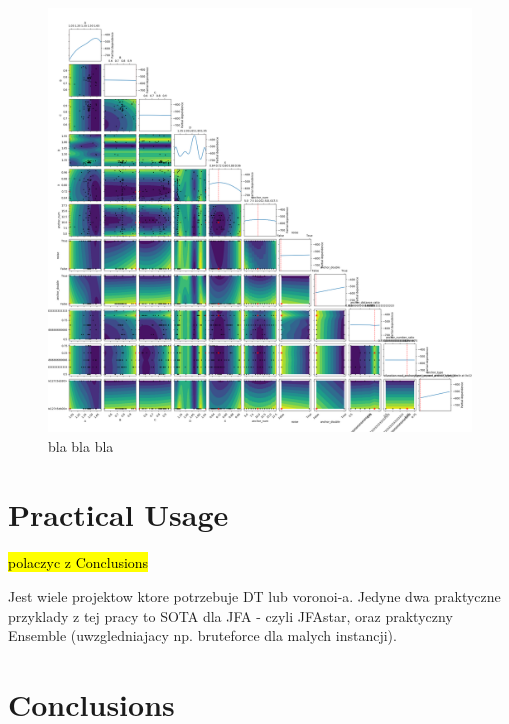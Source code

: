 \documentclass[format=acmsmall,screen,review,authordraft,nonacm]{acmart}
\begin{document}
\begin{figure}[H]
	\centering
	\includegraphics[width=\linewidth]{../figures/raport}
	\caption{bla bla bla}
	\label{fig:abstract}
\end{figure}

\section{Practical Usage} %

\hl{polaczyc z Conclusions}

Jest wiele projektow ktore potrzebuje DT lub voronoi-a. Jedyne dwa praktyczne
przyklady z tej pracy to SOTA dla JFA - czyli JFAstar, oraz praktyczny Ensemble
(uwzgledniajacy np. bruteforce dla malych instancji).

\section{Conclusions} %
\end{document}
